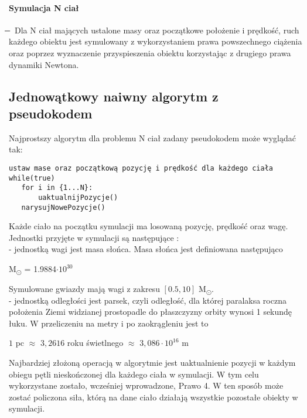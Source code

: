 \documentclass[14pt,twoside,a4paper]{article}
\begin{document}
\paragraph{Symulacja N ciał} 
\newcommand{\mi}{\boldsymbol{} \mathrel{\mkern -16mu} \boldsymbol{-}}
$\mi$
Dla N ciał mających ustalone masy oraz początkowe położenie i prędkość, ruch każdego obiektu jest symulowany z wykorzystaniem prawa powszechnego ciążenia oraz poprzez wyznaczenie przyspieszenia obiektu korzystając z drugiego prawa dynamiki Newtona.

\subsection{\Large Jednowątkowy naiwny algorytm z pseudokodem}

Najprostszy algorytm dla problemu N ciał zadany pseudokodem może wyglądać tak:\\


\begin{lstlisting}[frame=single, framerule=2pt, caption=pseudokod]
ustaw mase oraz początkową pozycję i prędkość dla każdego ciała
while(true)
   for i in {1...N}:
       uaktualnijPozycje()
   narysujNowePozycje()
\end{lstlisting}


Każde ciało na początku symulacji ma losowaną pozycję, prędkość oraz wagę. Jednostki przyjęte w symulacji są następujące : \\
- jednostką wagi jest masa słońca. Masa słońca jest definiowana następująco\\
\begin{center}
M\textsubscript{\(\odot\)} = 1.9884\(\cdot 10^{30}\)\\
\end{center}
Symulowane gwiazdy mają wagi z zakresu \([0.5, 10]\) M\textsubscript{\(\odot\)}.\\
- jednostką odległości jest parsek, czyli odległość, dla której paralaksa roczna położenia Ziemi widzianej prostopadle do płaszczyzny orbity wynosi 1 sekundę łuku. W przeliczeniu na metry i po zaokrągleniu jest to 
\begin{center}
\(1\) pc \(\approx\) \(3,2616\) roku świetlnego \(\approx\) \(3,086\cdot 10^{16}\) m\\
\end{center}
Najbardziej złożoną operacją w algorytmie jest uaktualnienie pozycji w każdym obiegu pętli nieskończonej dla każdego ciała w symulacji. W tym celu wykorzystane zostało, wcześniej wprowadzone, Prawo 4. W ten sposób może zostać policzona siła, którą na dane ciało działają wszystkie pozostałe obiekty w symulacji. 
\end{document}
